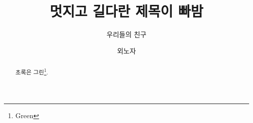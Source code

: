 \documentclass[sigconf, review]{acmart}
\begin{document}
\title{멋지고 길다란 제목이 빠밤}


\author{우리들의 친구}

\author{외노자}

\renewcommand{\shortauthors}{미대생들}


\begin{abstract}
초록은 그린\footnote{Green}.
\end{abstract}



\maketitle




 
\end{document}
